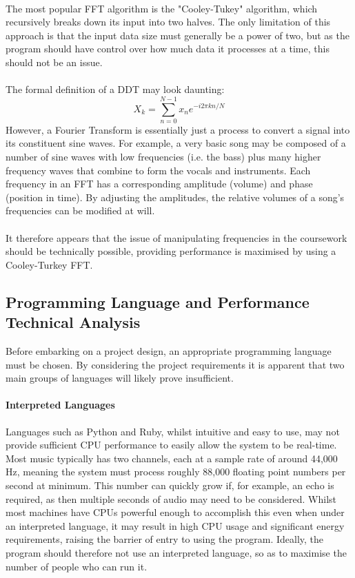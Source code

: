 \paragraph{}
The most popular FFT algorithm is the "Cooley-Tukey" algorithm, which recursively breaks down its input into two halves. The only limitation of  this approach is that the input data size must generally be a power of two, but as the program should have control over how much data it processes at a time, this should not be an issue.

\paragraph{}
The formal definition of a DDT may look daunting:
\[
X_k = \sum_{n=0}^{N-1} x_n e^{-i2\pi k n/N}
\]
However, a Fourier Transform is essentially just a process to convert a signal into its constituent sine waves. For example, a very basic song may be composed of a number of sine waves with low frequencies (i.e. the bass) plus many higher frequency waves that combine to form the vocals and instruments. Each frequency in an FFT has a corresponding amplitude (volume) and phase (position in time). By adjusting the amplitudes, the relative volumes of a song's frequencies can be modified at will.

\paragraph{}
It therefore appears that the issue of manipulating frequencies in the coursework should be technically possible, providing performance is maximised by using a Cooley-Turkey FFT.

\pagebreak
\subsection{Programming Language  and Performance Technical Analysis}
Before embarking on a project design, an appropriate programming language must be chosen. By considering the project requirements it is apparent that two main groups of languages will likely prove insufficient.

\paragraph{Interpreted Languages}
Languages such as Python and Ruby, whilst intuitive and easy to use, may not provide sufficient CPU performance to easily allow the system to be real-time. Most music typically has two channels, each at a sample rate of around 44,000 Hz, meaning the system must process roughly 88,000 floating point numbers per second at minimum. This number can quickly grow if, for example, an echo is required, as then multiple seconds of audio may need to be considered. Whilst most machines have CPUs powerful enough to accomplish this even when under an interpreted language, it may result in high CPU usage and significant energy requirements, raising the barrier of entry to using the program. Ideally, the program should therefore not use an interpreted language, so as to maximise the number of people who can run it.

